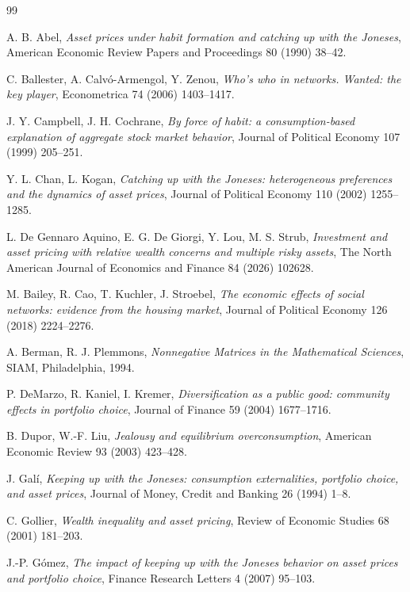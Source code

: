\begin{thebibliography}{99}

 A. B. Abel,
\emph{Asset prices under habit formation and catching up with the Joneses},
American Economic Review Papers and Proceedings 80 (1990) 38--42.

 C. Ballester, A. Calv\'o-Armengol, Y. Zenou,
\emph{Who's who in networks. Wanted: the key player},
Econometrica 74 (2006) 1403--1417.

 J. Y. Campbell, J. H. Cochrane,
\emph{By force of habit: a consumption-based explanation of aggregate stock
market behavior}, Journal of Political Economy 107 (1999) 205--251.

 Y. L. Chan, L. Kogan,
\emph{Catching up with the Joneses: heterogeneous preferences and the dynamics
of asset prices}, Journal of Political Economy 110 (2002) 1255--1285.

 L. De Gennaro Aquino, E. G. De Giorgi, Y. Lou, M. S. Strub,
\emph{Investment and asset pricing with relative wealth concerns and multiple
risky assets},
The North American Journal of Economics and Finance 84 (2026) 102628.

 M. Bailey, R. Cao, T. Kuchler, J. Stroebel,
\emph{The economic effects of social networks: evidence from the housing
market}, Journal of Political Economy 126 (2018) 2224--2276.

 A. Berman, R. J. Plemmons,
\emph{Nonnegative Matrices in the Mathematical Sciences},
SIAM, Philadelphia, 1994.

 P. DeMarzo, R. Kaniel, I. Kremer,
\emph{Diversification as a public good: community effects in portfolio choice},
Journal of Finance 59 (2004) 1677--1716.

 B. Dupor, W.-F. Liu,
\emph{Jealousy and equilibrium overconsumption},
American Economic Review 93 (2003) 423--428.

 J. Gal\'i,
\emph{Keeping up with the Joneses: consumption externalities, portfolio choice,
and asset prices},
Journal of Money, Credit and Banking 26 (1994) 1--8.

 C. Gollier,
\emph{Wealth inequality and asset pricing},
Review of Economic Studies 68 (2001) 181--203.

 J.-P. G\'omez,
\emph{The impact of keeping up with the Joneses behavior on asset prices and
portfolio choice},
Finance Research Letters 4 (2007) 95--103.


\end{thebibliography}
